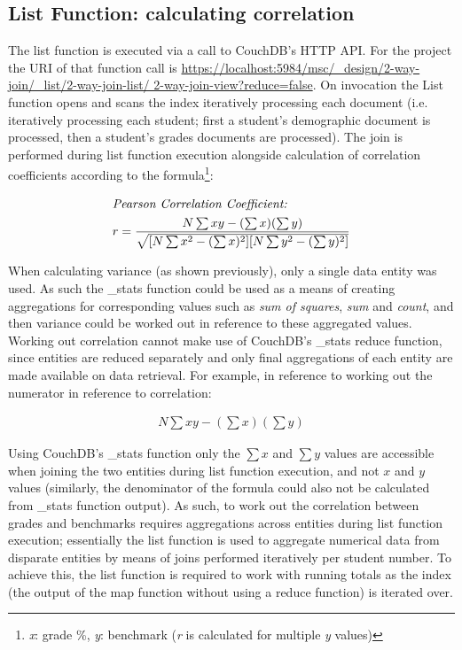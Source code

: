 \subsection{List Function: calculating correlation}
The list function is executed via a call to CouchDB's HTTP API. For the project the URI of that function call is \url{https://localhost:5984/msc/\_design/2-way-join/\_list/2-way-join-list/ 2-way-join-view?reduce=false}. On invocation the List function opens and scans the index iteratively processing each document (i.e. iteratively processing each student; first a student's demographic document is processed, then a student's grades documents are processed). The join is performed during list function execution alongside calculation of correlation coefficients according to the formula\footnote{\textit{x}: grade \%, \textit{y}: benchmark (\textit{r} is calculated for multiple \textit{y} values)}: \begin{spreadlines}{15pt}
    \begin{gather*}
        \intertext{\textit{Pearson Correlation Coefficient:}}
        r = \frac{N\sum{xy} - (\sum{x})(\sum{y})}{\sqrt{[N\sum{x^2} - (\sum{x})^2][N\sum{y^2} - (\sum{y})^2]}}
    \end{gather*}
\end{spreadlines}

When calculating variance (as shown previously), only a single data entity was used. As such the \_stats function could be used as a means of creating aggregations for corresponding values such as \textit{sum of squares}, \textit{sum} and \textit{count}, and then variance could be worked out in reference to these aggregated values. Working out correlation cannot make use of CouchDB's \_stats reduce function, since entities are reduced separately and only final aggregations of each entity are made available on data retrieval. For example, in reference to working out the numerator in reference to correlation: \begin{spreadlines}{15pt}
    \begin{gather*}
        N\sum{xy} - (\sum{x})(\sum{y})
    \end{gather*}
\end{spreadlines}

Using CouchDB's \_stats function only the $\sum{x}$ and $\sum{y}$ values are accessible when joining the two entities during list function execution, and not $x$ and $y$ values (similarly, the denominator of the formula could also not be calculated from \_stats function output). As such, to work out the correlation between grades and benchmarks requires aggregations across entities during list function execution; essentially the list function is used to aggregate numerical data from disparate entities by means of joins performed iteratively per student number. To achieve this, the list function is required to work with running totals as the index (the output of the map function without using a reduce function) is iterated over.

